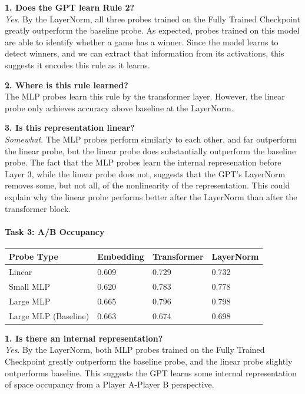 \documentclass[11pt]{article}
\begin{document}
\textbf{1. Does the GPT learn Rule 2?}\\
\emph{Yes}. By the LayerNorm, all three probes trained on the Fully
Trained Checkpoint greatly outperform the baseline probe. As expected,
probes trained on this model are able to identify whether a game has a
winner. Since the model learns to detect winners, and we can extract
that information from its activations, this suggests it encodes this
rule as it learns.

\textbf{2. Where is this rule learned?}\\
The MLP probes learn this rule by the transformer layer. However, the
linear probe only achieves accuracy above baseline at the LayerNorm.

\textbf{3. Is this representation linear?}\\
\emph{Somewhat}. The MLP probes perform similarly to each other, and far
outperform the linear probe, but the linear probe does substantially
outperform the baseline probe. The fact that the MLP probes learn the
internal represenation before Layer 3, while the linear probe does not,
suggests that the GPT's LayerNorm removes some, but not all, of the
nonlinearity of the representation. This could explain why the linear
probe performs better after the LayerNorm than after the transformer
block.

    \paragraph{Task 3: A/B Occupancy}\label{task-3-ab-occupancy}

\begin{longtable}[]{@{}llll@{}}
\toprule\noalign{}
Probe Type & Embedding & Transformer & LayerNorm \\
\midrule\noalign{}
\endhead
\bottomrule\noalign{}
\endlastfoot
Linear & 0.609 & 0.729 & 0.732 \\
Small MLP & 0.620 & 0.783 & 0.778 \\
Large MLP & 0.665 & 0.796 & 0.798 \\
Large MLP (Baseline) & 0.663 & 0.674 & 0.698 \\
\end{longtable}

\textbf{1. Is there an internal representation?}\\
\emph{Yes}. By the LayerNorm, both MLP probes trained on the Fully
Trained Checkpoint greatly outperform the baseline probe, and the linear
probe slightly outperforms baseline. This suggests the GPT learns some
internal representation of space occupancy from a Player A-Player B
perspective.
\end{document}
